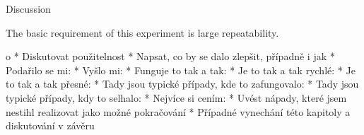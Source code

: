 \chap Discussion

The basic requirement of this experiment is large repeatability.

		\Green
		\begitems \style o
			* Diskutovat použitelnost
			* Napsat, co by se dalo zlepšit, případně i jak
			* Podařilo se mi:
			* Vyšlo mi:
			* Funguje to tak a tak:
			* Je to tak a tak rychlé:
			* Je to tak a tak přesné:
			* Tady jsou typické případy, kde to zafungovalo:
			* Tady jsou typické případy, kdy to selhalo:
			* Nejvíce si cením:
			* Uvést nápady, které jsem nestihl realizovat jako možné pokračování
			* Případné vynechání této kapitoly a diskutování v závěru
		\enditems
		\Black

